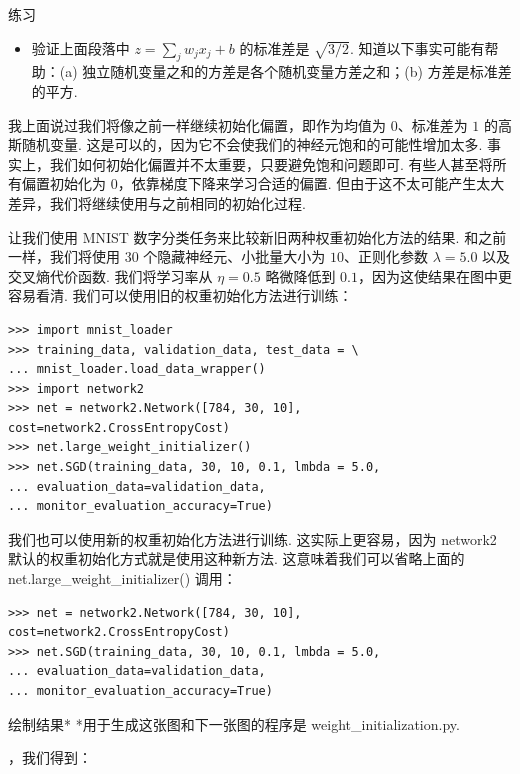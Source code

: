\begin{exerciseBox}{练习}

\begin{itemize}

\item 验证上面段落中 $z = \sum_j w_j x_j + b$ 的标准差是 $\sqrt{3/2}$. 知道以下事实可能有帮助：(a) 独立随机变量之和的方差是各个随机变量方差之和；(b) 方差是标准差的平方.

\end{itemize}

我上面说过我们将像之前一样继续初始化偏置，即作为均值为 $0$、标准差为 $1$ 的高斯随机变量. 这是可以的，因为它不会使我们的神经元饱和的可能性增加太多. 事实上，我们如何初始化偏置并不太重要，只要避免饱和问题即可. 有些人甚至将所有偏置初始化为 $0$，依靠梯度下降来学习合适的偏置. 但由于这不太可能产生太大差异，我们将继续使用与之前相同的初始化过程.

让我们使用 MNIST 数字分类任务来比较新旧两种权重初始化方法的结果. 和之前一样，我们将使用 $30$ 个隐藏神经元、小批量大小为 $10$、正则化参数 $\lambda = 5.0$ 以及交叉熵代价函数. 我们将学习率从 $\eta = 0.5$ 略微降低到 $0.1$，因为这使结果在图中更容易看清. 我们可以使用旧的权重初始化方法进行训练：

\begin{lstlisting}
>>> import mnist_loader
>>> training_data, validation_data, test_data = \
... mnist_loader.load_data_wrapper()
>>> import network2
>>> net = network2.Network([784, 30, 10], cost=network2.CrossEntropyCost)
>>> net.large_weight_initializer()
>>> net.SGD(training_data, 30, 10, 0.1, lmbda = 5.0,
... evaluation_data=validation_data,
... monitor_evaluation_accuracy=True)

\end{lstlisting}

我们也可以使用新的权重初始化方法进行训练. 这实际上更容易，因为 network2 默认的权重初始化方式就是使用这种新方法. 这意味着我们可以省略上面的 net.large\_\allowbreak{}weight\_\allowbreak{}initializer() 调用：

\begin{lstlisting}
>>> net = network2.Network([784, 30, 10], cost=network2.CrossEntropyCost)
>>> net.SGD(training_data, 30, 10, 0.1, lmbda = 5.0,
... evaluation_data=validation_data,
... monitor_evaluation_accuracy=True)

\end{lstlisting}

绘制结果* *用于生成这张图和下一张图的程序是 weight\_\allowbreak{}initialization.py.

，我们得到：


\end{exerciseBox}
